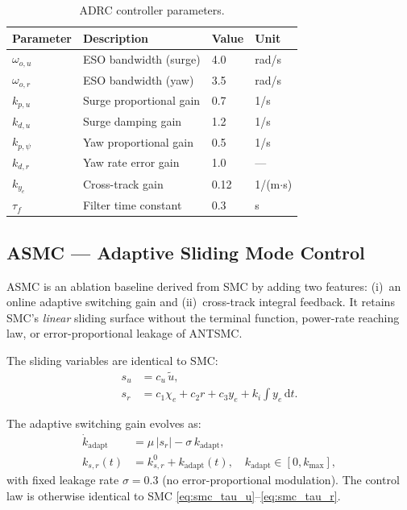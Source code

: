 \documentclass[review]{cas-dc}
\begin{document}
\begin{appendices}
\begin{table}[h]
\centering
\caption{ADRC controller parameters.}
\label{tab:adrc_params}
\begin{tabular}{llll}
\toprule
Parameter & Description & Value & Unit \\
\midrule
$\omega_{o,u}$ & ESO bandwidth (surge) & 4.0 & rad/s \\
$\omega_{o,r}$ & ESO bandwidth (yaw) & 3.5 & rad/s \\
$k_{p,u}$ & Surge proportional gain & 0.7 & 1/s \\
$k_{d,u}$ & Surge damping gain & 1.2 & 1/s \\
$k_{p,\psi}$ & Yaw proportional gain & 0.5 & 1/s \\
$k_{d,r}$ & Yaw rate error gain & 1.0 & --- \\
$k_{y_e}$ & Cross-track gain & 0.12 & 1/(m$\cdot$s) \\
$\tau_f$ & Filter time constant & 0.3 & s \\
\bottomrule
\end{tabular}
\end{table}


\subsection{ASMC --- Adaptive Sliding Mode Control}
\label{sec:app_asmc}

ASMC is an ablation baseline derived from SMC by adding two features: (i)~an online adaptive switching gain and (ii)~cross-track integral feedback. It retains SMC's \emph{linear} sliding surface without the terminal function, power-rate reaching law, or error-proportional leakage of ANTSMC.

The sliding variables are identical to SMC:
\begin{align}
s_u &= c_u\,\tilde{u}, \label{eq:asmc_su}\\
s_r &= c_1\chi_e + c_2 r + c_3 y_e + k_i\!\int\! y_e\,\mathrm{d}t. \label{eq:asmc_sr}
\end{align}

The adaptive switching gain evolves as:
\begin{align}
\dot{k}_{\mathrm{adapt}} &= \mu\,|s_r| - \sigma\, k_{\mathrm{adapt}}, \label{eq:asmc_adapt}\\
k_{s,r}(t) &= k_{s,r}^0 + k_{\mathrm{adapt}}(t), \quad k_{\mathrm{adapt}} \in [0, k_{\max}], \label{eq:asmc_gain}
\end{align}
with fixed leakage rate $\sigma = 0.3$ (no error-proportional modulation). The control law is otherwise identical to SMC \eqref{eq:smc_tau_u}--\eqref{eq:smc_tau_r}.


\end{appendices}
\end{document}
